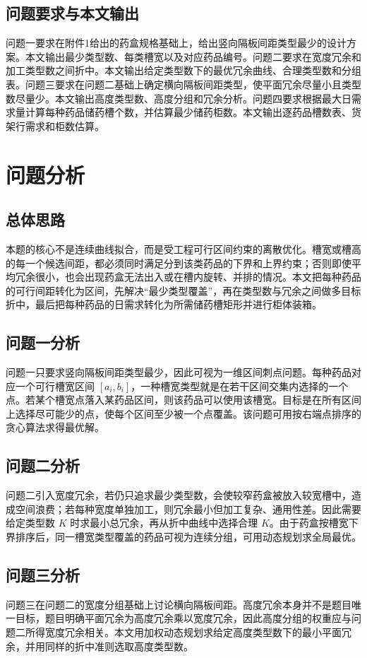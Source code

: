 \documentclass[UTF8,a4paper,12pt]{ctexart}
\begin{document}
\subsection{问题要求与本文输出}
问题一要求在附件1给出的药盒规格基础上，给出竖向隔板间距类型最少的设计方案。本文输出最少类型数、每类槽宽以及对应药品编号。问题二要求在宽度冗余和加工类型数之间折中。本文输出给定类型数下的最优冗余曲线、合理类型数和分组表。问题三要求在问题二基础上确定横向隔板间距类型，使平面冗余尽量小且类型数尽量少。本文输出高度类型数、高度分组和冗余分析。问题四要求根据最大日需求量计算每种药品储药槽个数，并估算最少储药柜数。本文输出逐药品槽数表、货架行需求和柜数估算。

\section{问题分析}
\subsection{总体思路}
本题的核心不是连续曲线拟合，而是受工程可行区间约束的离散优化。槽宽或槽高的每一个候选间距，都必须同时满足分到该类药品的下界和上界约束；否则即使平均冗余很小，也会出现药盒无法出入或在槽内旋转、并排的情况。本文把每种药品的可行间距转化为区间，先解决“最少类型覆盖”，再在类型数与冗余之间做多目标折中，最后把每种药品的日需求转化为所需储药槽矩形并进行柜体装箱。

\subsection{问题一分析}
问题一只要求竖向隔板间距类型最少，因此可视为一维区间刺点问题。每种药品对应一个可行槽宽区间 $[a_i,b_i]$，一种槽宽类型就是在若干区间交集内选择的一个点。若某个槽宽点落入某药品区间，则该药品可以使用该槽宽。目标是在所有区间上选择尽可能少的点，使每个区间至少被一个点覆盖。该问题可用按右端点排序的贪心算法求得最优解。

\subsection{问题二分析}
问题二引入宽度冗余，若仍只追求最少类型数，会使较窄药盒被放入较宽槽中，造成空间浪费；若每种宽度单独加工，则冗余最小但加工复杂、通用性差。因此需要给定类型数 $K$ 时求最小总冗余，再从折中曲线中选择合理 $K$。由于药盒按槽宽下界排序后，同一槽宽类型覆盖的药品可视为连续分组，可用动态规划求全局最优。

\subsection{问题三分析}
问题三在问题二的宽度分组基础上讨论横向隔板间距。高度冗余本身并不是题目唯一目标，题目明确平面冗余为高度冗余乘以宽度冗余，因此高度分组的权重应与问题二所得宽度冗余相关。本文用加权动态规划求给定高度类型数下的最小平面冗余，并用同样的折中准则选取高度类型数。
\end{document}
